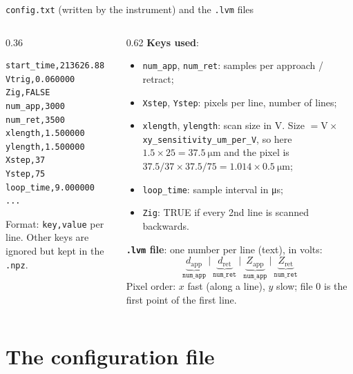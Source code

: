\documentclass[aspectratio=169,9pt]{beamer}
\begin{document}
\begin{frame}[fragile]{\texttt{config.txt} (written by the instrument) and the \texttt{.lvm} files}
\begin{columns}[T]
\begin{column}{0.36\textwidth}
\begin{lstlisting}
start_time,213626.88
Vtrig,0.060000
Zig,FALSE
num_app,3000
num_ret,3500
xlength,1.500000
ylength,1.500000
Xstep,37
Ystep,75
loop_time,9.000000
...
\end{lstlisting}
\scriptsize Format: \texttt{key,value} per line. Other keys are ignored but kept in the \texttt{.npz}.
\end{column}
\begin{column}{0.62\textwidth}\small
\textbf{Keys used}:
\begin{itemize}
\item \texttt{num\_app}, \texttt{num\_ret}: samples per approach / retract;
\item \texttt{Xstep}, \texttt{Ystep}: pixels per line, number of lines;
\item \texttt{xlength}, \texttt{ylength}: scan size in V. Size $=\text{V}\times$ \texttt{xy\_sensitivity\_um\_per\_V}, so here $1.5\times25=\SI{37.5}{\micro\metre}$ and the pixel is $37.5/37\times37.5/75=1.014\times\SI{0.5}{\micro\metre}$;
\item \texttt{loop\_time}: sample interval in \si{\micro\second};
\item \texttt{Zig}: TRUE if every 2nd line is scanned backwards.
\end{itemize}
\textbf{\texttt{.lvm} file}: one number per line (text), in volts:
\[\underbrace{d_\text{app}}_{\texttt{num\_app}}\ \Big|\ \underbrace{d_\text{ret}}_{\texttt{num\_ret}}\ \Big|\ \underbrace{Z_\text{app}}_{\texttt{num\_app}}\ \Big|\ \underbrace{Z_\text{ret}}_{\texttt{num\_ret}}\]
Pixel order: $x$ fast (along a line), $y$ slow; file 0 is the first point of the first line.
\end{column}
\end{columns}
\end{frame}

\section{The configuration file}
\end{document}
